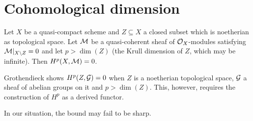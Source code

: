 \documentclass[a4paper,parskip=half,numbers=enddot, DIV=12]{scrreprt}
\begin{document}
\section{Cohomological dimension}
\begin{prop}[Grothendieck]
Let $X$ be a quasi-compact scheme and $Z\subseteq X$ a closed subset which is noetherian as topological space. %
Let $\mathcal{M}$ be a quasi-coherent sheaf of $\mathcal{O}_X$-modules satisfying $\mathcal{M}\vert_{X\setminus Z}=0$ and let $p>\dim(Z)$ (the Krull dimension of $Z$, which may be infinite). Then $H^p(X,\mathcal{M})=0$.
\end{prop}
\begin{rem*}
	Grothendieck shows $H^p(Z,\mathcal{G})=0$ when $Z$ is a noetherian topological space, $\mathcal{G}$ a sheaf of abelian groups on it and $p>\dim(Z)$. This, however, requires the construction of $H^p$ as a derived functor.
	
	In our situation, the bound may fail to be sharp.
\end{rem*}
\end{document}
